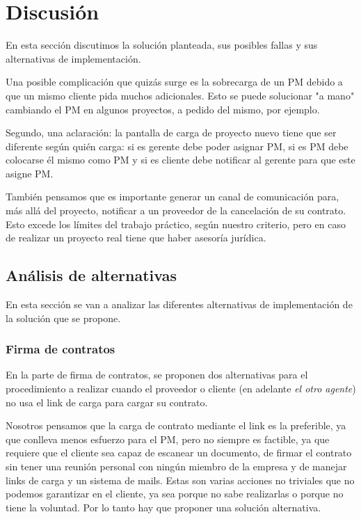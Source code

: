 \section{Discusión}
En esta sección discutimos la solución planteada, sus posibles fallas y sus alternativas de implementación.

Una posible complicación que quizás surge es la sobrecarga de un PM debido a que un mismo cliente pida muchos adicionales. Esto se puede solucionar "a mano" cambiando el PM en algunos proyectos, a pedido del mismo, por ejemplo.

Segundo, una aclaración: la pantalla de carga de proyecto nuevo tiene que ser diferente según quién carga: si es gerente debe poder asignar PM, si es PM debe colocarse él mismo como PM y si es cliente debe notificar al gerente para que este asigne PM.

También pensamos que es importante generar un canal de comunicación para, más allá del proyecto, notificar a un proveedor de la cancelación de su contrato. Esto excede los límites del trabajo práctico, según nuestro criterio, pero en caso de realizar un proyecto real tiene que haber asesoría jurídica.

\subsection{Análisis de alternativas}
En esta sección se van a analizar las diferentes alternativas de implementación de la solución que se propone.

\subsubsection{Firma de contratos}
En la parte de firma de contratos, se proponen dos alternativas para el procedimiento a realizar cuando el proveedor o cliente (en adelante \textit{el otro agente}) no usa el link de carga para cargar su contrato.

Nosotros pensamos que la carga de contrato mediante el link es la preferible, ya que conlleva menos esfuerzo para el PM, pero no siempre es factible, ya que requiere que el cliente sea capaz de escanear un documento, de firmar el contrato sin tener una reunión personal con ningún miembro de la empresa y de manejar links de carga y un sistema de mails.
Estas son varias acciones no triviales que no podemos garantizar en el cliente, ya sea porque no sabe realizarlas o porque no tiene la voluntad.
Por lo tanto hay que proponer una solución alternativa.

